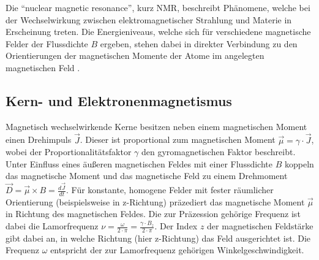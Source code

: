 \noindent Die \enquote{nuclear magnetic resonance}, kurz NMR, beschreibt Phänomene, welche
bei der Wechselwirkung zwischen elektromagnetischer Strahlung und Materie in
Erscheinung treten. Die Energieniveaus, welche sich für verschiedene magnetische
Felder der Flussdichte $B$ ergeben, stehen dabei in direkter Verbindung zu den
Orientierungen der magnetischen Momente der Atome im angelegten magnetischen
Feld \cite{nmr_relaxation}.
\subsection{Kern- und Elektronenmagnetismus}
\noindent Magnetisch wechselwirkende Kerne besitzen neben einem magnetischen
Moment einen Drehimpuls $\vec{J}$. Dieser ist proportional zum magnetischen
Moment $\vec{\mu} = \gamma \cdot \vec{J}$, wobei der Proportionalitätsfaktor
$\gamma$ den gyromagnetischen Faktor beschreibt. Unter Einfluss eines äußeren
magnetischen Feldes mit einer Flussdichte $B$ koppeln das magnetische Moment und das magnetische Feld
zu einem Drehmoment $\vec{D} = \vec{\mu} \times B = \frac{d \vec{J}}{dt}$.
Für konstante, homogene Felder mit fester räumlicher Orientierung
(beispielsweise in z-Richtung) präzediert das magnetische Moment $\vec{\mu}$
in Richtung des magnetischen Feldes. Die zur Präzession gehörige
Frequenz ist dabei die Lamorfrequenz $\nu = \frac{\omega}{2 \cdot \pi} =
\frac{\gamma \cdot B_z}{2 \cdot \pi}$. Der Index $z$ der magnetischen Feldstärke
gibt dabei an, in welche Richtung (hier z-Richtung) das Feld
ausgerichtet ist. Die Frequenz $\omega$ entspricht der zur Lamorfrequenz gehörigen
Winkelgeschwindigkeit.
